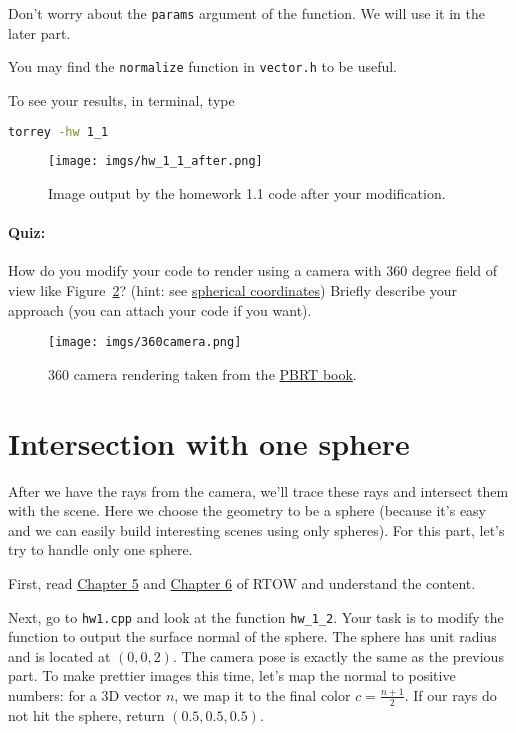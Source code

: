Don't worry about the \lstinline{params} argument of the function. We will use it in the later part.

You may find the \lstinline{normalize} function in \lstinline{vector.h} to be useful.

To see your results, in terminal, type
\begin{lstlisting}[language=bash]
  torrey -hw 1_1
\end{lstlisting}

\begin{figure}[ht]
    \centering
    \texttt{[image: imgs/hw\_1\_1\_after.png]}
    \caption{Image output by the homework 1.1 code after your modification.}
    \label{fig:hw_1_1_after}
\end{figure}

\paragraph{Quiz:} How do you modify your code to render using a camera with 360 degree field of view like Figure~\ref{fig:360_camera}? (hint: see \href{https://en.wikipedia.org/wiki/Spherical_coordinate_system}{spherical coordinates}) Briefly describe your approach (you can attach your code if you want).
\begin{figure}[ht]
    \centering
    \texttt{[image: imgs/360camera.png]}
    \caption{360 camera rendering taken from the \href{https://www.pbr-book.org/3ed-2018/Camera_Models/Environment_Camera}{PBRT book}.}
    \label{fig:360_camera}
\end{figure}

\section{Intersection with one sphere}
After we have the rays from the camera, we'll trace these rays and intersect them with the scene. Here we choose the geometry to be a sphere (because it's easy and we can easily build interesting scenes using only spheres). For this part, let's try to handle only one sphere.

First, read \href{https://raytracing.github.io/books/RayTracingInOneWeekend.html\#addingasphere}{Chapter 5} and \href{https://raytracing.github.io/books/RayTracingInOneWeekend.html\#surfacenormalsandmultipleobjects}{Chapter 6} of RTOW and understand the content.

Next, go to \lstinline{hw1.cpp} and look at the function \lstinline{hw_1_2}. Your task is to modify the function to output the surface normal of the sphere. The sphere has unit radius and is located at $(0, 0, 2)$. The camera pose is exactly the same as the previous part. To make prettier images this time, let's map the normal to positive numbers: for a 3D vector $n$, we map it to the final color $c = \frac{n + 1}{2}$. If our rays do not hit the sphere, return $(0.5, 0.5, 0.5)$.

